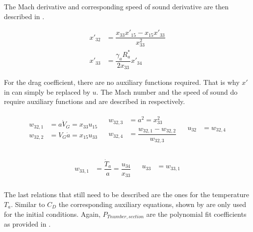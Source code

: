 \noindent
The Mach derivative and corresponding speed of sound derivative are then described in .

 \begin{equation} \label{eq:cdDerAux}
\begin{split}
x'_{32} &= \dfrac{x_{33}x'_{15}-x_{15}x'_{33}}{x_{33}^{2}}\\
x'_{33} &= \dfrac{\gamma_{a}R_{a}^{*}}{2x_{33}}x'_{34} 
\end{split}
\end{equation}

\noindent
For the drag coefficient, there are no auxiliary functions required. That is why $x'$ in  can simply be replaced by $u$. The Mach number and the speed of sound do require auxiliary functions and are described in  respectively.

\begin{align} \label{eq:u32}
\begin{split}
w_{32,1} &= a\dot{V}_{G} = x_{33}u_{15} \\
w_{32,2} &= V_{G}\dot{a} = x_{15}u_{33} \\
\end{split}
&
\begin{split}
w_{32,3} &= a^{2} = x_{33}^2 \\
w_{32,4} &= \dfrac{w_{32,1}-w_{32,2}}{w_{32,3}} \\
\end{split}
&
\begin{split}
u_{32} &= w_{32,4} \\
\end{split}
\end{align}

\begin{align} \label{eq:u33}
\begin{split}
w_{33,1} &= \dfrac{\dot{T}_{a}}{a} = \dfrac{u_{34}}{x_{33}} \\
\end{split}
&
\begin{split}
u_{33} &= w_{33,1} \\
\end{split}
\end{align}

\noindent
The last relations that still need to be described are the ones for the temperature $T_{a}$. Similar to $C_{D}$ the corresponding auxiliary equations, shown by  are only used for the initial conditions. Again, $P_{T number,section}$ are the polynomial fit coefficients as provided in .

